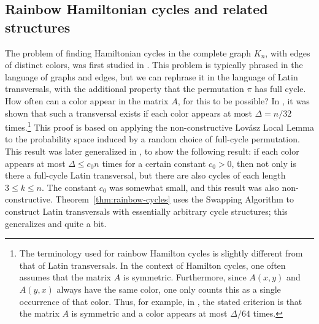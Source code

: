 \subsection{Rainbow Hamiltonian cycles and related structures}
The problem of finding Hamiltonian cycles in the complete graph $K_n$, with edges of distinct colors, was first studied in \cite{hahn-thomassen}. This problem is typically phrased in the language of graphs and edges, but we can rephrase it in the language of Latin transversals, with the additional property that the permutation $\pi$ has full cycle. How often can a color appear in the matrix $A$, for this to be possible? In \cite{albert}, it was shown that such a transversal exists if each color appears at most $\Delta = n/32$ times.\footnote{The terminology used for rainbow Hamilton cycles is slightly different from that of Latin transversals. In the context of Hamilton cycles, one often assumes that the matrix $A$ is symmetric. Furthermore, since $A(x,y)$ and $A(y,x)$ always have the same color, one only counts this as a single occurrence of that color. Thus, for example, in \cite{albert}, the stated criterion is that the matrix $A$ is symmetric and a color appears at most $\Delta/64$ times.} This proof is based on applying the non-constructive Lov\'{a}sz Local Lemma to the probability space induced by a random choice of full-cycle permutation.
This result was later generalized in \cite{kriv}, to show the following result: if each color appears at most $\Delta \leq c_0 n$ times for a certain constant $c_0 > 0$, then not only is there a full-cycle Latin transversal, but there are also cycles of each length $3 \leq k \leq n$. The constant $c_0$ was somewhat small, and this result was also non-constructive.
Theorem~\ref{thm:rainbow-cycles} uses the Swapping Algorithm to construct Latin transversals with essentially arbitrary cycle structures; this generalizes \cite{kriv} and \cite{albert} quite a bit. 

